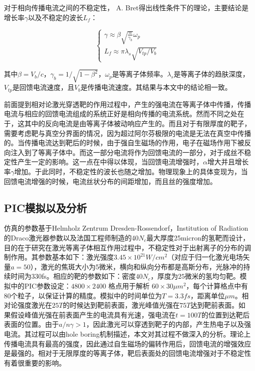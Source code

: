 对于相向传播电流之间的不稳定性， A. Bret\cite{bret2005characterization,bret2009weibel}得出线性条件下的理论，主要结论是增长率$\gamma$以及不稳定的波长$L_f$：


\begin{equation}
\label{eqn:dispersion}
\begin{cases}
{\gamma} \approx \beta \sqrt{\frac{{\alpha}}{{\gamma}_b}} {\omega}_p   \\
L_f \approx \pi {\lambda}_s \sqrt{V_{tp}/V_b}
\end{cases}
\end{equation}


其中$\beta= V_b/c$，${\gamma}_b = 1/ \sqrt{1-{\beta}^2}$，$\omega_p$是等离子体频率。${\lambda}_s$是等离子体的趋肤深度， $V_{tp}$是回馈电流速度，且$V_b$是传播电流速度。其结果与本文中的结论相一致。



前面提到相对论激光穿透靶的作用过程中，产生的强电流在等离子体中传播，传播电流与相应的回馈电流组成的系统正好是相向传播的电流系统。然而不同之处在于，这其中的反向电流是由等离子体被动响应产生的。而且对于有限厚度的靶子，需要考虑靶与真空分界面的情况，因为超过阿尔芬极限的电流是无法在真空中传播的。当传播电流达到靶后的时候，由于强自生磁场的作用，电子在磁场作用下被反向注入到了等离子体中。而这一部分电流将作为回馈电流的一部分，对于成丝不稳定性产生一定的影响。这一点在\cite{eqn:dispersion}中得以体现，当回馈电流增强时，$\alpha$增大并且增长率$\gamma$增加。于此同时，不稳定性的波长也随之增加。物理现象上的具体变现为，当回馈电流增强的时候，电流丝状分布的间距增加，而且丝的强度增加。



\subsection{PIC模拟以及分析}


仿真的参数基于Helmholz Zentrum Dresden-Rossendorf，Institution of Radiation的Draco激光器参数以及法国工程师制造的40$N_c$最大厚度25micron的氢靶而设计，目的在于研究在激光等离子体相互作用过程中，不稳定性对于出射离子的分布的调制作用。其参数基本如下：激光强度$3.45 \times 10^{21} W/cm^2$（对应于归一化激光电场矢量$a=50$），激光的焦斑大小为5微米，横向和纵向分布都是高斯分布，光脉冲的持续时间为330fs。相应的靶的参数如下：密度$40N_c$，厚度为$25$微米的氢均匀靶。模拟中的PIC参数设定：$4800 \times 2400$ 格点用于解析 $60 \times 30 {\mu m}^2$，每个计算格点中有80个粒子，以保证计算的精度。模拟中的时间单位为$T=3.3fs$，距离单位$\mu m$。相对论强度激光在$25T$的时候达到靶前表面，激光峰值光强在$75T$达到靶前表面。如果假设峰值光强在前表面产生的电流具有光速，强电流在$t=100T$的位置到达靶后表面的位置。由于$a/{n \gamma} > 1$，因此激光可以穿透到靶子的内部，产生热电子以及强电流。其过程可以由hole boring机制描述，本文对其过程不做深入的分析。理论上传播电流具有最高的强度，因此通过自生磁场的偏转作用后，回馈电流的增强效应是最强的。相对于无限厚度的等离子体，靶后表面处的回馈电流增强对于不稳定性有着很重要的影响。


